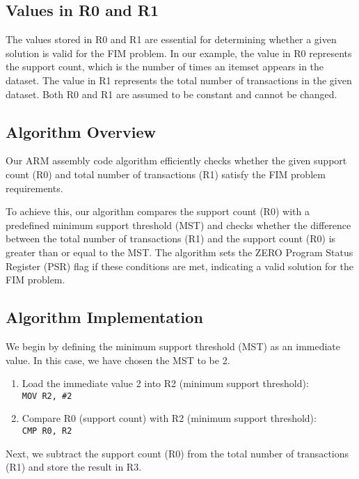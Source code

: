 \subsection{Values in R0 and R1}

The values stored in R0 and R1 are essential for determining whether a given solution is valid for the FIM problem. In our example, the value in R0 represents the support count, which is the number of times an itemset appears in the dataset. The value in R1 represents the total number of transactions in the given dataset. Both R0 and R1 are assumed to be constant and cannot be changed.

\subsection{Algorithm Overview}

Our ARM assembly code algorithm efficiently checks whether the given support count (R0) and total number of transactions (R1) satisfy the FIM problem requirements.

To achieve this, our algorithm compares the support count (R0) with a predefined minimum support threshold (MST) and checks whether the difference between the total number of transactions (R1) and the support count (R0) is greater than or equal to the MST. The algorithm sets the ZERO Program Status Register (PSR) flag if these conditions are met, indicating a valid solution for the FIM problem.

\subsection{Algorithm Implementation}

We begin by defining the minimum support threshold (MST) as an immediate value. In this case, we have chosen the MST to be 2.

\begin{enumerate}
    \item Load the immediate value 2 into R2 (minimum support threshold): \\ \texttt{MOV R2, \#2}
    \item Compare R0 (support count) with R2 (minimum support threshold): \\ \texttt{CMP R0, R2}
\end{enumerate}

Next, we subtract the support count (R0) from the total number of transactions (R1) and store the result in R3.

